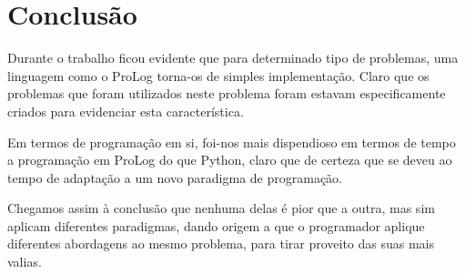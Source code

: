 \documentclass[12pt,a4paper]{article}
\begin{document}
\section{Conclusão}
Durante o trabalho ficou evidente que para determinado tipo de problemas, uma linguagem como o ProLog torna-os de simples implementação. Claro que os problemas que foram utilizados neste problema foram estavam especificamente criados para evidenciar esta característica.

Em termos de programação em si, foi-nos mais dispendioso em termos de tempo a programação em ProLog do que Python, claro que de certeza que se deveu ao tempo de adaptação a um novo paradigma de programação.

Chegamos assim à conclusão que nenhuma delas é pior que a outra, mas sim aplicam diferentes paradigmas, dando origem a que o programador aplique diferentes abordagens ao mesmo problema, para tirar proveito das suas mais valias.



\end{document}
